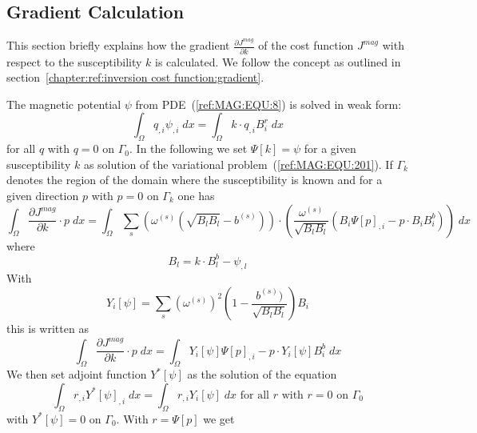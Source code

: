 \subsection{Gradient Calculation}
This section briefly explains how the gradient
$\frac{\partial J^{mag}}{\partial k}$ of the cost function $J^{mag}$ with
respect to the susceptibility $k$ is calculated.  We follow the concept as outlined in section~\ref{chapter:ref:inversion cost function:gradient}.

The magnetic potential $\psi$ from PDE~(\ref{ref:MAG:EQU:8}) is solved in weak form:
\begin{equation}\label{ref:IMAG:EQU:201}
\int_{\Omega} q_{,i} \psi_{,i} \; dx  = \int_{\Omega}  k \cdot q_{,i}  B^r_i \; dx 
\end{equation} 
for all $q$ with $q=0$ on $\Gamma_{0}$.
In the following we set $\Psi[k]=\psi$ for a given susceptibility $k$ as
solution of the variational problem~(\ref{ref:MAG:EQU:201}).
If $\Gamma_{k}$ denotes the region of the domain where the susceptibility is
known and for a given direction $p$ with $p=0$ on $\Gamma_{k}$ one has
\begin{equation}\label{ref:IMAG:EQU:201aa}
\int_{\Omega}   \frac{\partial J^{mag}}{\partial k} \cdot p \; dx  = \int_{\Omega}  
\sum_{s} (\omega^{(s)} 
( \sqrt{B_lB_l}-b^{(s)}) )  \cdot ( \frac{\omega^{(s)}}{\sqrt{B_lB_l}} (B_i \Psi[p]_{,i} - p  \cdot B_i B^b_i  ) ) \; dx  
\end{equation}
where 
\begin{equation}\label{ref:IMAG:EQU:201aaa}
B_l = k \cdot B^b_l - \psi_{,l}    
\end{equation}
With
\begin{equation}\label{ref:IMAG:EQU:202c}
Y_i[\psi]=   \sum_{s} 
(\omega^{(s)})^2 
(1-\frac{b^{(s)})}{\sqrt{B_lB_l}} ) B_i
\end{equation} 
this is written as 
\begin{equation}\label{ref:IMAG:EQU:202cc}
\int_{\Omega}   \frac{\partial J^{mag}}{\partial k} \cdot p \;  dx  = \int_{\Omega}  
Y_i[\psi] \Psi[p]_{,i} - p \cdot Y_i[\psi]B^b_i   \; dx  
\end{equation} 
We then set adjoint function $Y^*[\psi]$ as the solution of the equation 
\begin{equation}\label{ref:IMAG:EQU:202d}
\int_{\Omega} r_{,i} Y^*[\psi]_{,i} \; dx  =  \int_{\Omega} r_{,i} Y_i[\psi]  \; dx  \mbox{ for all } r \mbox{ with } r=0 \mbox{ on } \Gamma_{0}
\end{equation} 
with $Y^*[\psi]=0$ on $\Gamma_{0}$. With $r=\Psi[p]$ we get
